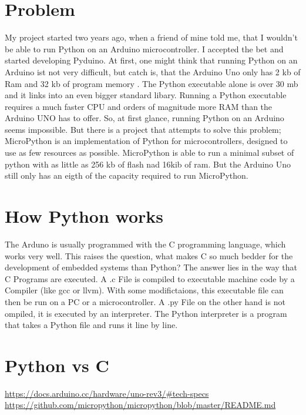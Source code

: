 \documentclass{article}
\begin{document}
\begin{multicols}{2}

\section{Problem}
My project started two years ago, when a friend of mine told me, that I wouldn't be able to run Python on an Arduino microcontroller. I accepted the bet and started developing Pyduino. At first, one might think that running Python on an Arduino ist not very difficult, but catch is, that the Arduino Uno only has 2 kb of Ram and 32 kb of program memory \cite{Q1}. The Python executable alone is over 30 mb and it links into an even bigger standard libary. Running a Python executable requires a much faster CPU and orders of magnitude more RAM than the Arduino UNO has to offer. So, at first glance, running Python on an Arduino seems impossible. But there is a project that attempts to solve this problem; MicroPython is an implementation of Python for microcontrollers, designed to use as few resources as possible. MicroPython is able to run a minimal subset of python with as little as 256 kb of flash nad 16kib of ram. But the Arduino Uno still only has an eigth of the capacity required to run MicroPython.
\section{How Python works}
The Arduno is usually programmed with the C programming language, which works very well. This raises the question, what makes C so much bedder for the development of embedded systems than Python? The answer lies in the way that C Programs are executed. A .c File is compiled to executable machine code by a Compiler (like gcc or llvm). With some modifictaions, this executable file can then be run on a PC or a microcontroller. A .py File on the other hand is not ompiled, it is executed by an interpreter. The Python interpreter is a program that takes a Python file and runs it line by line.
\section{Python vs C}




\begin{thebibliography}{99}
\url{https://docs.arduino.cc/hardware/uno-rev3/#tech-specs}
\url{https://github.com/micropython/micropython/blob/master/README.md}
\end{thebibliography}
\end{multicols}
\end{document}
